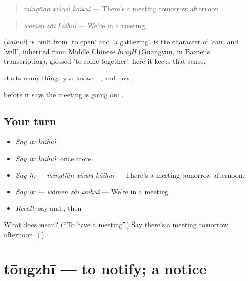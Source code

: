 \begin{quote}
\textbf{} \emph{míngtiān xiàwǔ kāihuì} — There's a meeting tomorrow afternoon.
\end{quote}

\begin{quote}
\textbf{} \emph{wǒmen zài kāihuì} — We're in a meeting.
\end{quote}

\begin{cousinweb}
\textbf{} (\emph{kāihuì}) is built from  'to open' and  'a gathering'.  is the character of  'can' and  'will', inherited from Middle Chinese \emph{hwajH} (Guangyun, in Baxter's transcription), glossed 'to come together': here it keeps that sense.
\end{cousinweb}

\begin{grammarlens}[title={What you've built}]
 starts many things you know: , , and now .

 before it says the meeting is going on: .
\end{grammarlens}

\subsection*{Your turn}
\begin{itemize}
\raggedright
  \item \emph{Say it:} \emph{kāihuì}
  \item \emph{Say it:} \emph{kāihuì}, once more
  \item \emph{Say it:}  — \emph{míngtiān xiàwǔ kāihuì} — There's a meeting tomorrow afternoon.
  \item \emph{Say it:}  — \emph{wǒmen zài kāihuì} — We're in a meeting.
  \item \emph{Recall:} say  and , then 
\end{itemize}

\begin{tcolorbox}[breakable,colback=teal!4,colframe=teal!35!black,title={Before you move on}]
What does  mean? (\textquotedblleft{}To have a meeting\textquotedblright{}.) Say there's a meeting tomorrow afternoon. (\textbf{}.)
\end{tcolorbox}
\section[tōngzhī]{tōngzhī — to notify; a notice}

